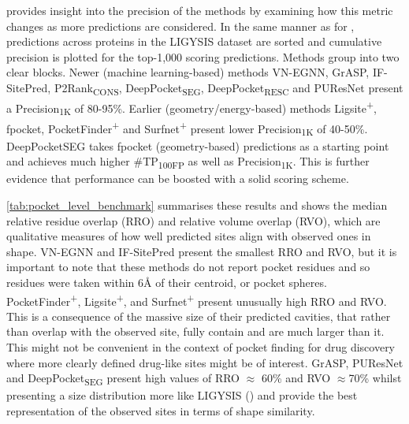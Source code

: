  provides insight into the precision of the methods by examining how this metric changes as more predictions are considered. In the same manner as for , predictions across proteins in the LIGYSIS dataset are sorted and cumulative precision is plotted for the top-1,000 scoring predictions. Methods group into two clear blocks. Newer (machine learning-based) methods VN-EGNN, GrASP, IF-SitePred, P2Rank\textsubscript{CONS}, DeepPocket\textsubscript{SEG}, DeepPocket\textsubscript{RESC} and PUResNet present a Precision\textsubscript{1K} of 80-95\%. Earlier (geometry/energy-based) methods Ligsite\textsuperscript{+}, fpocket, PocketFinder\textsuperscript{+} and Surfnet\textsuperscript{+} present lower Precision\textsubscript{1K} of 40-50\%. DeepPocketSEG takes fpocket (geometry-based) predictions as a starting point and achieves much higher \#TP\textsubscript{100FP} as well as Precision\textsubscript{1K}. This is further evidence that performance can be boosted with a solid scoring scheme.

\autoref{tab:pocket_level_benchmark} summarises these results and shows the median relative residue overlap (RRO) and relative volume overlap (RVO), which are qualitative measures of how well predicted sites align with observed ones in shape. VN-EGNN and IF-SitePred present the smallest RRO and RVO, but it is important to note that these methods do not report pocket residues and so residues were taken within 6Å of their centroid, or pocket spheres. PocketFinder\textsuperscript{+}, Ligsite\textsuperscript{+}, and Surfnet\textsuperscript{+} present unusually high RRO and RVO. This is a consequence of the massive size of their predicted cavities, that rather than overlap with the observed site, fully contain and are much larger than it. This might not be convenient in the context of pocket finding for drug discovery where more clearly defined drug-like sites might be of interest. GrASP, PUResNet and DeepPocket\textsubscript{SEG} present high values of RRO $\approx$ 60\% and RVO $\approx $70\% whilst presenting a size distribution more like LIGYSIS () and provide the best representation of the observed sites in terms of shape similarity.

